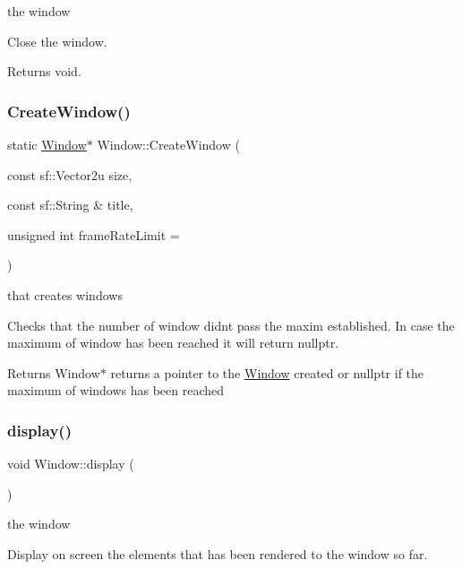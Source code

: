 the window

Close the window.

\begin{DoxyReturn}{Returns}
void. 
\end{DoxyReturn}
\mbox{\label{class_window_ac23ace79f02693ff5463f91dba8bb38b}} 
\subsubsection{\texorpdfstring{Create\+Window()}{CreateWindow()}}
{\footnotesize\ttfamily static \hyperlink{class_window}{Window}$\ast$ Window\+::\+Create\+Window (\begin{DoxyParamCaption}\item[{const sf\+::\+Vector2u}]{size,  }\item[{const sf\+::\+String \&}]{title,  }\item[{unsigned int}]{frame\+Rate\+Limit = {} }\end{DoxyParamCaption})\hspace{0.3cm}{\ttfamily [static]}}

that creates windows

Checks that the number of window didn\textquotesingle{}t pass the maxim established. In case the maximum of window has been reached it will return nullptr.

\begin{DoxyReturn}{Returns}
Window$\ast$ returns a pointer to the \hyperlink{class_window}{Window} created or nullptr if the maximum of windows has been reached 
\end{DoxyReturn}
\mbox{\label{class_window_afadfafa5a0b9472554759004aafb327e}} 
\subsubsection{\texorpdfstring{display()}{display()}}
{\footnotesize\ttfamily void Window\+::display (\begin{DoxyParamCaption}{ }\end{DoxyParamCaption})}

the window

Display on screen the elements that has been rendered to the window so far.

